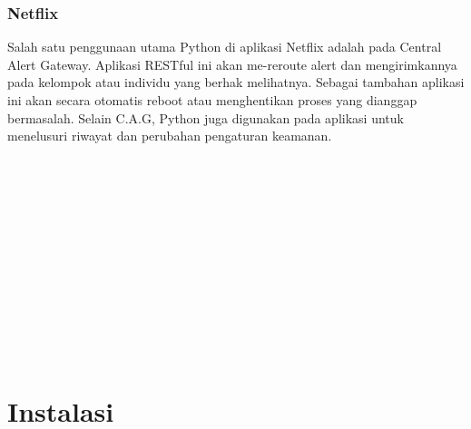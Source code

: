 \documentclass[12pt, times new roman, a4paper]{article}
\begin{document}
\subsubsection{Netflix}
Salah satu penggunaan utama Python di aplikasi Netflix adalah pada Central Alert Gateway. Aplikasi RESTful ini akan me-reroute alert dan mengirimkannya pada kelompok atau individu yang berhak melihatnya. Sebagai tambahan aplikasi ini akan secara otomatis reboot atau menghentikan proses yang dianggap bermasalah. Selain C.A.G, Python juga digunakan pada aplikasi untuk menelusuri riwayat dan perubahan pengaturan keamanan.
\\
\\
\\
\\
\\
\\
\\
\\
\\
\\
\\
\\
\\
\section{Instalasi}
\end{document}
